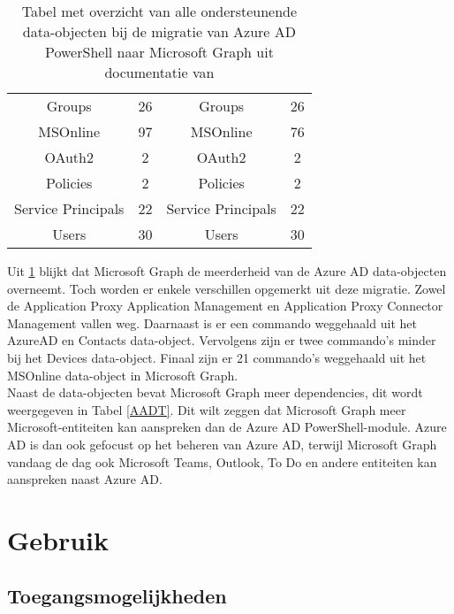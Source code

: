 \begin{table}
\begin{tabular}{ |c|c||c|c| }
        Groups & 26 & Groups & 26 \\ 
        MSOnline & 97 & MSOnline & 76 \\
        OAuth2 & 2 & OAuth2 & 2 \\ 
        Policies & 2 & Policies & 2 \\ 
        Service Principals & 22 & Service Principals & 22 \\ 
        Users & 30 & Users & 30 \\ 
        \hline
    \end{tabular}
    \caption[Tabel migratie Azure AD data-objecten naar Microsoft Graph]{Tabel met overzicht van alle ondersteunende data-objecten bij de migratie van Azure \ac{AD} PowerShell naar Microsoft Graph uit documentatie van \textcite{Microsoft2023l}}
    \label{AADMSG}
\end{table}

Uit \ref{AADMSG} blijkt dat Microsoft Graph de meerderheid van de Azure \ac{AD} data-objecten overneemt. Toch worden er enkele verschillen opgemerkt uit deze migratie. Zowel de Application Proxy Application Management en Application Proxy Connector Management vallen weg. Daarnaast is er een commando weggehaald uit het AzureAD en Contacts data-object. Vervolgens zijn er twee commando's minder bij het Devices data-object. Finaal zijn er 21 commando's weggehaald uit het MSOnline data-object in Microsoft Graph. \\

Naast de data-objecten bevat Microsoft Graph meer dependencies, dit wordt weergegeven in Tabel \ref{AADT}. Dit wilt zeggen dat Microsoft Graph meer Microsoft-entiteiten kan aanspreken dan de Azure \ac{AD} PowerShell-module. Azure \ac{AD} is dan ook gefocust op het beheren van Azure \ac{AD}, terwijl Microsoft Graph vandaag de dag ook Microsoft Teams, Outlook, To Do en andere entiteiten kan aanspreken naast Azure \ac{AD}. 


\section{Gebruik}

\subsection{Toegangsmogelijkheden}



